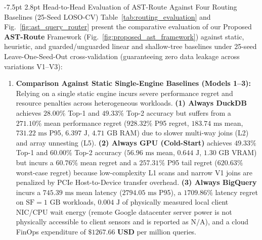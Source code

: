 \documentclass[10pt,a4paper]{article}
\makeatletter
\renewcommand\subsection{\@startsection{subsection}{2}{\z@}%
  {-7.5pt \@plus -2pt \@minus -1pt}%
  {2.8pt \@plus 1pt}%
  {\normalfont\normalsize\bfseries}}
\makeatother
\begin{document}
\subsection{Head-to-Head Evaluation of AST-Route Against Four Routing Baselines (25-Seed LOSO-CV)}
Table~\ref{tab:routing_evaluation} and Fig.~\ref{fig:ast_query_router} present the comparative evaluation of our Proposed \textbf{AST-Route} Framework (Fig.~\ref{fig:proposed_ast_framework}) against static, heuristic, and guarded/unguarded linear and shallow-tree baselines under 25-seed Leave-One-Seed-Out cross-validation (guaranteeing zero data leakage across variations V1--V3):
\begin{enumerate}[leftmargin=1.5em,itemsep=0.8pt]
    \item \textbf{Comparison Against Static Single-Engine Baselines (Models 1--3):} Relying on a single static engine incurs severe performance regret and resource penalties across heterogeneous workloads. \textbf{(1) Always DuckDB} achieves $28.00\%$ Top-1 and $49.33\%$ Top-2 accuracy but suffers from a $\mathbf{271.10\%}$ mean performance regret ($928.32\%$ P95 regret, $183.74\text{ ms}$ mean, $731.22\text{ ms}$ P95, $6.397\text{ J}$, $4.71\text{ GB}$ RAM) due to slower multi-way joins (L2) and array unnesting (L5). \textbf{(2) Always GPU (Cold-Start)} achieves $49.33\%$ Top-1 and $60.00\%$ Top-2 accuracy ($56.96\text{ ms}$ mean, $0.644\text{ J}$, $1.30\text{ GB}$ VRAM) but incurs a $\mathbf{60.76\%}$ mean regret and a $\mathbf{257.31\%}$ P95 tail regret ($620.63\%$ worst-case regret) because low-complexity L1 scans and narrow V1 joins are penalized by PCIe Host-to-Device transfer overhead. \textbf{(3) Always BigQuery} incurs a $745.39\text{ ms}$ mean latency ($2794.05\text{ ms}$ P95), a $\mathbf{1709.86\%}$ latency regret on $\text{SF}=1\text{ GB}$ workloads, $0.004\text{ J}$ of physically measured local client NIC/CPU wait energy (remote Google datacenter server power is not physically accessible to client sensors and is reported as $\text{N/A}$), and a cloud FinOps expenditure of $\mathbf{\$1267.66\text{ USD}}$ per million queries.

\end{enumerate}
\end{document}
